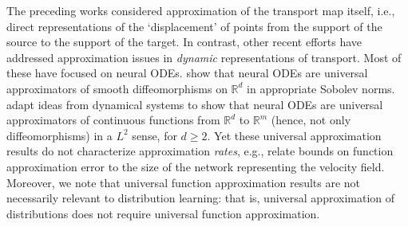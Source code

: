 The preceding works considered approximation of the transport map itself, i.e., direct representations of the `displacement' of points from the support of the source to the support of the target. In contrast, other recent efforts have addressed approximation issues in \textit{dynamic} representations of transport. Most of these have focused on neural ODEs. 
\citet{SupApproximation} show that neural ODEs are universal approximators of smooth diffeomorphisms on $\mathbb{R}^d$ in appropriate Sobolev norms. \citet{DynamicalSystem} adapt ideas from dynamical systems to show that neural ODEs are universal approximators of continuous functions from $\mathbb{R}^d$ to $\mathbb{R}^m$ (hence, not only diffeomorphisms) in a $L^2$ sense, for $d \geq 2$. Yet these universal approximation results do not characterize approximation \emph{rates}, e.g., relate bounds on function approximation error to the size of the network representing the velocity field. Moreover, we note that universal {function} approximation results are not necessarily relevant to {distribution} learning: that is, universal approximation of distributions does not require universal function approximation.


    

